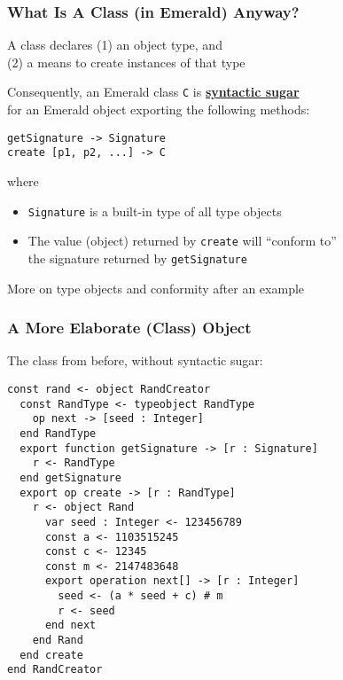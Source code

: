 \begin{frame}[fragile]

\frametitle{What Is A Class (in Emerald) Anyway?}

\begin{center}

A class declares (1) an object type, and \\ (2) a means to create
instances of that type

\end{center}

\vspace{\fill}

Consequently, an Emerald class \texttt{C} is
\textbf{\underline{syntactic sugar}}\\ for an Emerald object exporting
the following methods:

\begin{lstlisting}
getSignature -> Signature
create [p1, p2, ...] -> C
\end{lstlisting}

where

\begin{itemize}

\item \lstinline{Signature} is a built-in type of all type objects

\item The value (object) returned by \texttt{create} will ``conform
to''\\ the signature returned by \texttt{getSignature}

\end{itemize}

More on type objects and conformity after an example

\end{frame}

\begin{frame}[fragile]

\frametitle{A More Elaborate (Class) Object}

The class from before, without syntactic sugar:

\begin{lstlisting}
const rand <- object RandCreator
  const RandType <- typeobject RandType
    op next -> [seed : Integer]
  end RandType
  export function getSignature -> [r : Signature]
    r <- RandType
  end getSignature
  export op create -> [r : RandType]
    r <- object Rand
      var seed : Integer <- 123456789
      const a <- 1103515245
      const c <- 12345
      const m <- 2147483648
      export operation next[] -> [r : Integer]
        seed <- (a * seed + c) # m
        r <- seed
      end next
    end Rand
  end create
end RandCreator
\end{lstlisting}

\end{frame}

